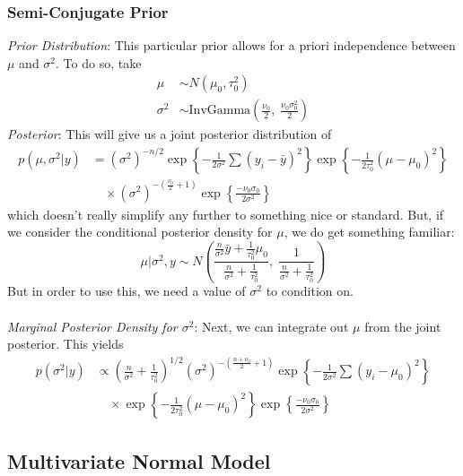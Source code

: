 \documentclass[a4paper,12pt]{scrartcl}
\begin{document}
\newpage
\subsubsection{Semi-Conjugate Prior}

{\sl Prior Distribution}:
This particular prior allows for a priori independence between
$\mu$ and $\sigma^2$. To do so, take
\begin{align*}
   \mu &\sim N(\mu_0, \tau_0^2)\\
   \sigma^2 &\sim \text{InvGamma}\left(\frac{\nu_0}{2}, \; \frac{\nu_0
      \sigma_0^2}{2}\right)
\end{align*}
{\sl Posterior}: This will give us a joint posterior distribution of 
\begin{align*}
   p(\mu, \sigma^2 | y) &= (\sigma^2)^{-n/2} \exp\left\{
      -\frac{1}{2\sigma^2} \sum (y_i - \bar{y})^2 \right\}
      \exp\left\{ -\frac{1}{2\tau_0^2} (\mu-\mu_0)^2\right\} \\
      &\quad \times (\sigma^2)^{-\left(\frac{\nu_0}{2} +1\right)} 
      \exp\left\{ \frac{-\nu_0\sigma_0}{2\sigma^2}\right\}
\end{align*}
which doesn't really simplify any further to something nice or standard.
But, if we consider the conditional posterior density for $\mu$, we
do get something familiar:
   \[ \mu | \sigma^2, y \sim N\left(\frac{\frac{n}{\sigma^2} \bar{y}
     +\frac{1}{\tau_0^2}\mu_0}{\frac{n}{\sigma^2} + \frac{1}{\tau_0^2}},
       \; \frac{1}{\frac{n}{\sigma^2} + 
       \frac{1}{\tau_0^2}}\right) \]
But in order to use this, we need a value of $\sigma^2$ to condition on.
\\
\\
\emph{Marginal Posterior Density for $\sigma^2$}: 
Next, we can integrate out $\mu$ from the joint posterior. This yields
\begin{align*}
   p(\sigma^2 | y)&\propto \left(\frac{n}{\sigma^2} + \frac{1}{\tau_0^2}
   \right)^{1/2}  (\sigma^2)^{-\left(\frac{n+\nu_0}{2}+1\right)}
    \exp\left\{
      -\frac{1}{2\sigma^2} \sum (y_i - \mu_0)^2 \right\}\\
     &\quad \times\exp\left\{ -\frac{1}{2\tau_0^2} (\mu-\mu_0)^2\right\}
      \exp\left\{ \frac{-\nu_0\sigma_0}{2\sigma^2}\right\}
\end{align*}


\newpage
\subsection{Multivariate Normal Model}
\end{document}
